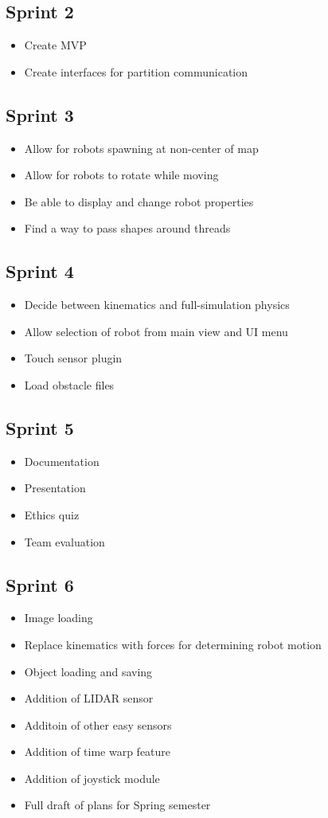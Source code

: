 \subsection{Sprint 2}
\begin{itemize}
	\item Create MVP
	\item Create interfaces for partition communication 
\end{itemize}

\subsection{Sprint 3}
\begin{itemize}
	\item Allow for robots spawning at non-center of map
	\item Allow for robots to rotate while moving
 	\item Be able to display and change robot properties
 	\item Find a way to pass shapes around threads
\end{itemize}

\subsection{Sprint 4}
\begin{itemize}
	\item Decide between kinematics and full-simulation physics
	\item Allow selection of robot from main view and UI menu
	\item Touch sensor plugin
 	\item Load obstacle files
\end{itemize}

\subsection{Sprint 5}
\begin{itemize}
	\item Documentation
	\item Presentation
 	\item Ethics quiz
 	\item Team evaluation
\end{itemize}

\subsection{Sprint 6}
\begin{itemize}
	\item Image loading
	\item Replace kinematics with forces for determining robot motion
 	\item Object loading and saving
 	\item Addition of LIDAR sensor
 	\item Additoin of other easy sensors
 	\item Addition of time warp feature
 	\item Addition of joystick module
 	\item Full draft of plans for Spring semester
\end{itemize}

